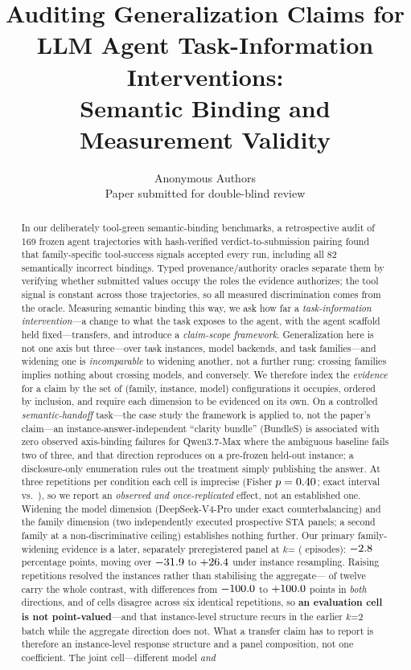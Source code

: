 \documentclass{article}
\title{Auditing Generalization Claims for\\LLM Agent Task-Information Interventions:\\Semantic Binding and Measurement Validity}
\author{Anonymous Authors\\ Paper submitted for double-blind review}
\begin{document}
\maketitle

\begin{abstract}
In our deliberately tool-green semantic-binding benchmarks, a retrospective audit of 169 frozen agent trajectories with hash-verified verdict-to-submission pairing found that family-specific tool-success signals accepted every run, including all 82 semantically incorrect bindings. Typed provenance/authority oracles separate them by verifying whether submitted values occupy the roles the evidence authorizes; the tool signal is constant across those trajectories, so all measured discrimination comes from the oracle. Measuring semantic binding this way, we ask how far a \emph{task-information intervention}---a change to what the task exposes to the agent, with the agent scaffold held fixed---transfers, and introduce a \emph{claim-scope framework}. Generalization here is not one axis but three---over task instances, model backends, and task families---and widening one is \emph{incomparable} to widening another, not a further rung: crossing families implies nothing about crossing models, and conversely. We therefore index the \emph{evidence} for a claim by the set of (family, instance, model) configurations it occupies, ordered by inclusion, and require each dimension to be evidenced on its own. On a controlled \emph{semantic-handoff} task---the case study the framework is applied to, not the paper's claim---an instance-answer-independent ``clarity bundle'' (BundleS) is associated with zero observed axis-binding failures for Qwen3.7-Max where the ambiguous baseline fails two of three, and that direction reproduces on a pre-frozen held-out instance; a disclosure-only enumeration rules out the treatment simply publishing the answer. At three repetitions per condition each cell is imprecise (Fisher $p=0.40$; exact interval \StatSZeroTreatCI{} vs.\ \StatSZeroBaseCI{}), so we report an \emph{observed and once-replicated} effect, not an established one. Widening the model dimension (DeepSeek-V4-Pro under exact counterbalancing) and the family dimension (two independently executed prospective STA panels; a second family at a non-discriminative ceiling) establishes nothing further. Our primary family-widening evidence is a later, separately preregistered panel at $k$=\StatEightAK{} (\StatEightAEpisodes{} episodes): $-2.8$ percentage points, moving over $-31.9$ to $+26.4$ under instance resampling. Raising repetitions resolved the instances rather than stabilising the aggregate---\StatEightAInformativeN{} of twelve carry the whole contrast, with differences from $-100.0$ to $+100.0$ points in \emph{both} directions, and \StatEightAUnstableCells{} of \StatEightACells{} cells disagree across six identical repetitions, so \textbf{an evaluation cell is not point-valued}---and that instance-level structure recurs in the earlier $k$=2 batch while the aggregate direction does not. What a transfer claim has to report is therefore an instance-level response structure and a panel composition, not one coefficient. The joint cell---different model \emph{and} 
\end{abstract}
\end{document}
